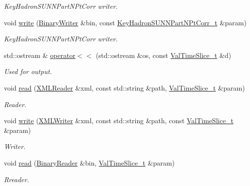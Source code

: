 \begin{DoxyCompactItemize}
\begin{DoxyCompactList}\small\item\em Key\+Hadron\+S\+U\+N\+N\+Part\+N\+Pt\+Corr writer. \end{DoxyCompactList}\item 
void \mbox{\hyperlink{namespaceHadron_a767bdf4c228c06edad1c47918ec75ed3}{write}} (\mbox{\hyperlink{classADATIO_1_1BinaryWriter}{Binary\+Writer}} \&bin, const \mbox{\hyperlink{structHadron_1_1KeyHadronSUNNPartNPtCorr__t}{Key\+Hadron\+S\+U\+N\+N\+Part\+N\+Pt\+Corr\+\_\+t}} \&param)
\begin{DoxyCompactList}\small\item\em Key\+Hadron\+S\+U\+N\+N\+Part\+N\+Pt\+Corr writer. \end{DoxyCompactList}\item 
std\+::ostream \& \mbox{\hyperlink{namespaceHadron_ab6f642c04562e34b1b2aa6e4bcfa60e7}{operator$<$$<$}} (std\+::ostream \&os, const \mbox{\hyperlink{structHadron_1_1ValTimeSlice__t}{Val\+Time\+Slice\+\_\+t}} \&d)
\begin{DoxyCompactList}\small\item\em Used for output. \end{DoxyCompactList}\item 
void \mbox{\hyperlink{namespaceHadron_aa4df93329eeddeec176cd9df5abe9ce1}{read}} (\mbox{\hyperlink{classADATXML_1_1XMLReader}{X\+M\+L\+Reader}} \&xml, const std\+::string \&path, \mbox{\hyperlink{structHadron_1_1ValTimeSlice__t}{Val\+Time\+Slice\+\_\+t}} \&param)
\begin{DoxyCompactList}\small\item\em Reader. \end{DoxyCompactList}\item 
void \mbox{\hyperlink{namespaceHadron_ab3f6a936fc8ba9b50904aca066146f48}{write}} (\mbox{\hyperlink{classADATXML_1_1XMLWriter}{X\+M\+L\+Writer}} \&xml, const std\+::string \&path, const \mbox{\hyperlink{structHadron_1_1ValTimeSlice__t}{Val\+Time\+Slice\+\_\+t}} \&param)
\begin{DoxyCompactList}\small\item\em Writer. \end{DoxyCompactList}\item 
void \mbox{\hyperlink{namespaceHadron_ad59dd6905268b9fa8e1bf10fef767b9b}{read}} (\mbox{\hyperlink{classADATIO_1_1BinaryReader}{Binary\+Reader}} \&bin, \mbox{\hyperlink{structHadron_1_1ValTimeSlice__t}{Val\+Time\+Slice\+\_\+t}} \&param)
\begin{DoxyCompactList}\small\item\em Rreader. \end{DoxyCompactList}\item 

\end{DoxyCompactItemize}
